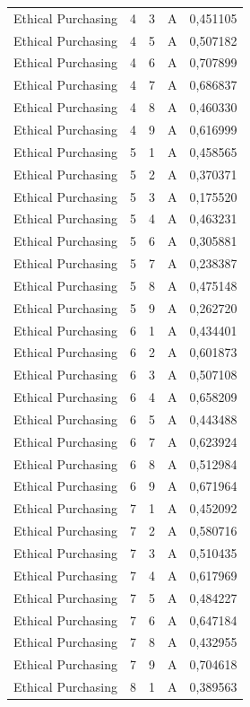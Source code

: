 \begin{longtable}{lrrrr}
Ethical Purchasing & 4 & 3 & A & 0,451105 \\
Ethical Purchasing & 4 & 5 & A & 0,507182 \\
Ethical Purchasing & 4 & 6 & A & 0,707899 \\
Ethical Purchasing & 4 & 7 & A & 0,686837 \\
Ethical Purchasing & 4 & 8 & A & 0,460330 \\
Ethical Purchasing & 4 & 9 & A & 0,616999 \\
Ethical Purchasing & 5 & 1 & A & 0,458565 \\
Ethical Purchasing & 5 & 2 & A & 0,370371 \\
Ethical Purchasing & 5 & 3 & A & 0,175520 \\
Ethical Purchasing & 5 & 4 & A & 0,463231 \\
Ethical Purchasing & 5 & 6 & A & 0,305881 \\
Ethical Purchasing & 5 & 7 & A & 0,238387 \\
Ethical Purchasing & 5 & 8 & A & 0,475148 \\
Ethical Purchasing & 5 & 9 & A & 0,262720 \\
Ethical Purchasing & 6 & 1 & A & 0,434401 \\
Ethical Purchasing & 6 & 2 & A & 0,601873 \\
Ethical Purchasing & 6 & 3 & A & 0,507108 \\
Ethical Purchasing & 6 & 4 & A & 0,658209 \\
Ethical Purchasing & 6 & 5 & A & 0,443488 \\
Ethical Purchasing & 6 & 7 & A & 0,623924 \\
Ethical Purchasing & 6 & 8 & A & 0,512984 \\
Ethical Purchasing & 6 & 9 & A & 0,671964 \\
Ethical Purchasing & 7 & 1 & A & 0,452092 \\
Ethical Purchasing & 7 & 2 & A & 0,580716 \\
Ethical Purchasing & 7 & 3 & A & 0,510435 \\
Ethical Purchasing & 7 & 4 & A & 0,617969 \\
Ethical Purchasing & 7 & 5 & A & 0,484227 \\
Ethical Purchasing & 7 & 6 & A & 0,647184 \\
Ethical Purchasing & 7 & 8 & A & 0,432955 \\
Ethical Purchasing & 7 & 9 & A & 0,704618 \\
Ethical Purchasing & 8 & 1 & A & 0,389563 \\

\end{longtable}
